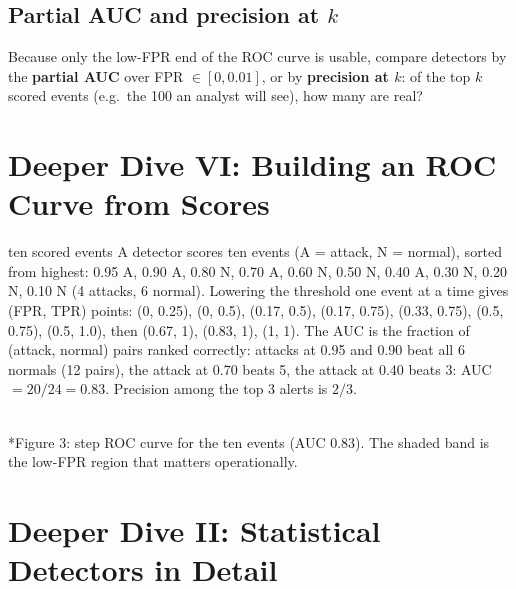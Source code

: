 \documentclass[11pt]{article}
\begin{document}
\subsection{Partial AUC and precision at $k$}
Because only the low-FPR end of the ROC curve is usable, compare detectors by the \textbf{partial AUC} over FPR $\in[0,0.01]$, or by \textbf{precision at $k$}: of the top $k$ scored events (e.g.\ the 100 an analyst will see), how many are real?

\section{Deeper Dive VI: Building an ROC Curve from Scores}
\begin{example}{ten scored events}
A detector scores ten events (A = attack, N = normal), sorted from highest: 0.95 A, 0.90 A, 0.80 N, 0.70 A, 0.60 N, 0.50 N, 0.40 A, 0.30 N, 0.20 N, 0.10 N (4 attacks, 6 normal). Lowering the threshold one event at a time gives (FPR, TPR) points: (0, 0.25), (0, 0.5), (0.17, 0.5), (0.17, 0.75), (0.33, 0.75), (0.5, 0.75), (0.5, 1.0), then (0.67, 1), (0.83, 1), (1, 1). The AUC is the fraction of (attack, normal) pairs ranked correctly: attacks at 0.95 and 0.90 beat all 6 normals (12 pairs), the attack at 0.70 beats 5, the attack at 0.40 beats 3: AUC $=20/24=0.83$. Precision among the top 3 alerts is $2/3$.
\end{example}
\begin{center}\\*{\small\color{GreyN}Figure 3: step ROC curve for the ten events (AUC 0.83). The shaded band is the low-FPR region that matters operationally.}\end{center}

\section{Deeper Dive II: Statistical Detectors in Detail}
\end{document}
